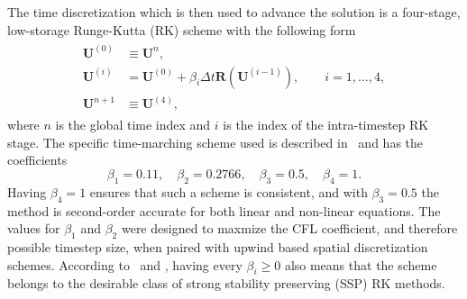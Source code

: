 The time discretization which is then used to advance the solution is a four-stage, low-storage Runge-Kutta (RK) scheme with the following form
\begin{align}
\begin{split}
\mathbf{U}^{(0)} &\equiv \mathbf{U}^n,\\
\mathbf{U}^{(i)} &= \mathbf{U}^{(0)} + \beta_i \Delta t \mathbf{R} \left(\mathbf{U}^{(i-1)}\right),\qquad i=1,\ldots ,4,\\
\mathbf{U}^{n+1} &\equiv \mathbf{U}^{(4)},
\end{split}
\end{align}
where $n$ is the global time index and $i$ is the index of the intra-timestep RK stage. The specific time-marching scheme used is described in~\cite{Lallemand1990} and has the coefficients
\begin{equation}
\beta_1=0.11,\quad \beta_2=0.2766,\quad \beta_3=0.5,\quad \beta_4=1.
\end{equation}
Having $\beta_4=1$ ensures that such a scheme is consistent, and with $\beta_3=0.5$ the method is second-order accurate for both linear and non-linear equations. The values for $\beta_1$ and $\beta_2$ were designed to maxmize the CFL coefficient, and therefore possible timestep size, when paired with upwind based spatial discretization schemes. According to~\cite{Shu1988} and \cite{Macdonald2003}, having every $\beta_i \geq 0$ also means that the scheme belongs to the desirable class of strong stability preserving (SSP) RK methods.

